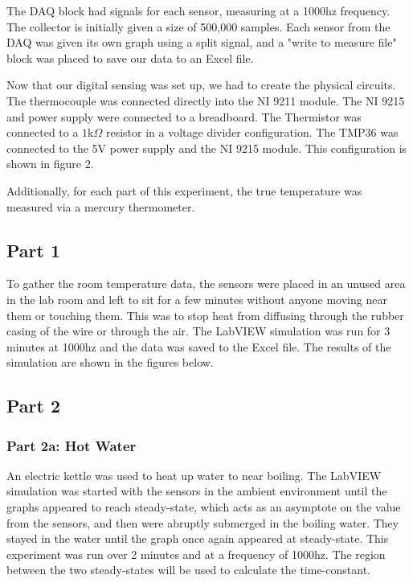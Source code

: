 \documentclass{article}
\begin{document}
The DAQ block had signals for each sensor, measuring at a 1000hz frequency.  The collector is initially given a size of 500,000 samples.  Each sensor from the DAQ was given its own graph using a split signal, and a "write to measure file" block was placed to save our data to an Excel file.  

Now that our digital sensing was set up, we had to create the physical circuits. The thermocouple was connected directly into the NI 9211 module.  The NI 9215 and power supply were connected to a breadboard. 
 The Thermistor was connected to a $1\text{k}\Omega$ resistor in a voltage divider configuration. The TMP36 was connected to the 5V power supply and the NI 9215 module.  This configuration is shown in figure 2.

 Additionally, for each part of this experiment, the true temperature was measured via a mercury thermometer.

\subsection{Part 1} %

To gather the room temperature data, the sensors were placed in an unused area in the lab room and left to sit for a few minutes without anyone moving near them or touching them.  This was to stop heat from diffusing through the rubber casing of the wire or through the air. The LabVIEW simulation was run for 3 minutes at 1000hz and the data was saved to the Excel file. The results of the simulation are shown in the figures below.

\subsection{Part 2} %
 
\subsubsection{Part 2a: Hot Water} %

An electric kettle was used to heat up water to near boiling.  The LabVIEW simulation was started with the sensors in the ambient environment until the graphs appeared to reach steady-state, which acts as an asymptote on the value from the sensors, and then were abruptly submerged in the boiling water.  They stayed in the water until the graph once again appeared at steady-state.  This experiment was run over 2 minutes and at a frequency of 1000hz.  The region between the two steady-states will be used to calculate the time-constant.  
\end{document}
